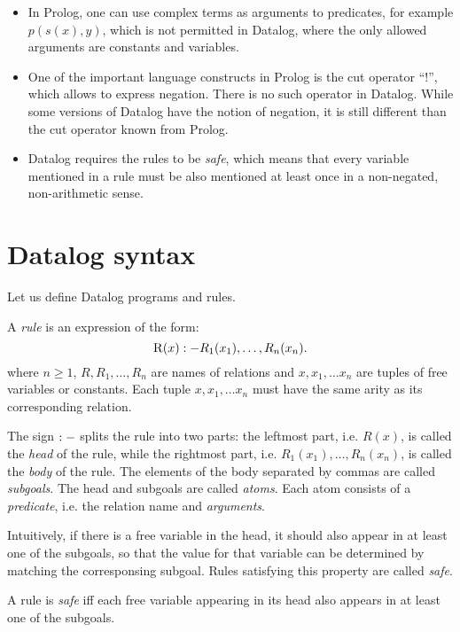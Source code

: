 \begin{itemize}
\item In Prolog, one can use complex terms as arguments to predicates, for example $p(s(x), y)$, which is not permitted in Datalog, where the only allowed arguments are constants and variables.
\item One of the important language constructs in Prolog is the cut operator ``!'', which allows to express negation. There is no such operator in Datalog. While some versions of Datalog have the notion of negation, it is still different than the cut operator known from Prolog.
\item Datalog requires the rules to be \emph{safe}, which means that every variable mentioned in a rule must be also mentioned at least once in a non-negated, non-arithmetic sense.
\end{itemize}

\section{Datalog syntax}
Let us define Datalog programs and rules.

\begin{defn}[Rule]\label{d:datalogrule}
A \emph{rule} is an expression of the form:
$$ \textsc{R}(x) :- R_1(x_1), \dots, R_n(x_n). $$
where $n \ge 1$, $R, R_1, \dots, R_n$ are names of relations and $x, x_1, \dots x_n$ are tuples of free variables or constants. Each tuple $x, x_1, \dots x_n$ must have the same arity as its corresponding relation.
\end{defn}

The sign $:-$ splits the rule into two parts: the leftmost part, i.e. $R(x)$, is called the \emph{head} of the rule, while the rightmost part, i.e. $R_1(x_1), \dots, R_n(x_n)$, is called the \emph{body} of the rule. The elements of the body separated by commas are called \emph{subgoals}. The head and subgoals are called \emph{atoms}. Each atom consists of a \emph{predicate}, i.e. the relation name and \emph{arguments}.

Intuitively, if there is a free variable in the head, it should also appear in at least one of the subgoals, so that the value for that variable can be determined by matching the corresponsing subgoal. Rules satisfying this property are called \emph{safe}.

\begin{defn}\label{d:datalogsaferule}
A rule is \emph{safe} iff each free variable appearing in its head also appears in at least one of the subgoals.
\end{defn}

